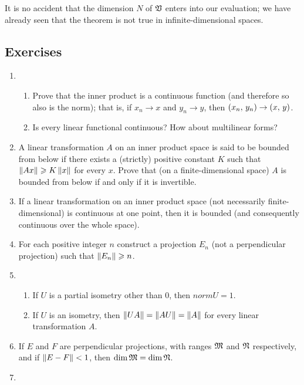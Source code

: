 It is no accident that the dimension \(N\) of \(\mathfrak{V}\) enters into our
evaluation; we have already seen that the theorem is not true in
infinite-dimensional spaces.

{\small
\subsection*{Exercises}
\begin{enumerate}[wide]
    \item\begin{enumerate}[wide, nosep, label=(\alph*)]
        \item Prove that the inner product is a continuous function (and
        therefore so also is the norm); that is, if \(x_n \to x\) and \(y_n \to
        y\), then \(\left(x_n,\,y_n\right) \to \left(x,\,y\right)\).
        
        \item Is every linear functional continuous? How about multilinear forms?
    \end{enumerate}

    \item A linear transformation \(A\) on an inner product space is said to be
    bounded from below if there exists a (strictly) positive constant \(K\) such
    that \(\left\lVert Ax\right\rVert \geqslant K\left\lVert x\right\rVert\) for every \(x\). Prove that (on a
    finite-dimensional space) \(A\) is bounded from below if and only if it is
    invertible.
    
    \item If a linear transformation on an inner product space (not necessarily
    finite-dimensional) is continuous at one point, then it is bounded (and
    consequently continuous over the whole space).
    
    \item For each positive integer \(n\) construct a projection \(E_n\) (not a
    perpendicular projection) such that \(\left\lVert E_n\right\rVert \geqslant n\).
    
    \item \begin{enumerate}[wide, nosep, label=(\alph*)]
        \item If \(U\) is a partial isometry other than \(0\), then \(norm{U} = 1\).
        
        \item If \(U\) is an isometry, then \(\left\lVert UA\right\rVert = \left\lVert AU\right\rVert = \left\lVert A\right\rVert\) for every linear transformation \(A\).
    \end{enumerate}

    \item If \(E\) and \(F\) are perpendicular projections, with ranges \(\mathfrak{M}\) and \(\frak{N}\) respectively, and if \(\left\lVert E - F\right\rVert < 1\), then
    \(\dim \mathfrak{M} = \dim \frak{N}\).

    \item 
\end{enumerate}

}

